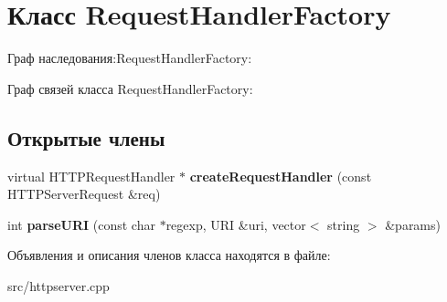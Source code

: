 \hypertarget{classRequestHandlerFactory}{}\section{Класс Request\+Handler\+Factory}
\label{classRequestHandlerFactory}


Граф наследования\+:Request\+Handler\+Factory\+:


Граф связей класса Request\+Handler\+Factory\+:
\subsection*{Открытые члены}
\begin{DoxyCompactItemize}
\item 
\mbox{\label{classRequestHandlerFactory_aebad8d8fe7db434c432b500066bbbd3f}} 
virtual H\+T\+T\+P\+Request\+Handler $\ast$ {\bfseries create\+Request\+Handler} (const H\+T\+T\+P\+Server\+Request \&req)
\item 
\mbox{\label{classRequestHandlerFactory_abff2aa525b66bac4badad15b5eb2be34}} 
int {\bfseries parse\+U\+RI} (const char $\ast$regexp, U\+RI \&uri, vector$<$ string $>$ \&params)
\end{DoxyCompactItemize}


Объявления и описания членов класса находятся в файле\+:\begin{DoxyCompactItemize}
\item 
src/httpserver.\+cpp\end{DoxyCompactItemize}
